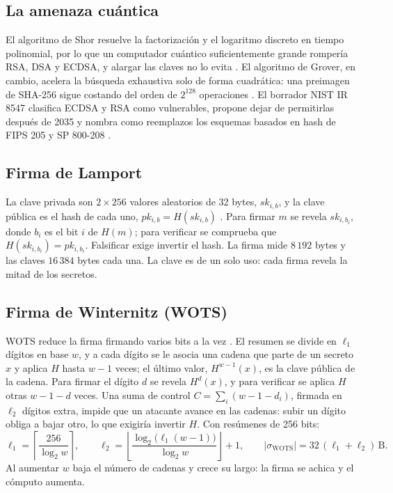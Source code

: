 \documentclass[12pt,letterpaper]{article}
\newcommand{\B}{\,\mathrm{B}}   %
\begin{document}
\subsection{La amenaza cuántica}
El algoritmo de Shor resuelve la factorización y el logaritmo discreto en tiempo polinomial, por lo que un computador cuántico suficientemente grande rompería RSA, DSA y ECDSA, y alargar las claves no lo evita \parencite{shor1994}. El algoritmo de Grover, en cambio, acelera la búsqueda exhaustiva solo de forma cuadrática: una preimagen de SHA-256 sigue costando del orden de $2^{128}$ operaciones \parencite{grover1996}. El borrador NIST IR 8547 clasifica ECDSA y RSA como vulnerables, propone dejar de permitirlas después de 2035 y nombra como reemplazos los esquemas basados en hash de FIPS 205 y SP 800-208 \parencite{nistir8547}.

\subsection{Firma de Lamport}
La clave privada son $2\times256$ valores aleatorios de 32 bytes, $sk_{i,b}$, y la clave pública es el hash de cada uno, $pk_{i,b}=H(sk_{i,b})$ \parencite{lamport1979}. Para firmar $m$ se revela $sk_{i,b_i}$, donde $b_i$ es el bit $i$ de $H(m)$; para verificar se comprueba que $H(sk_{i,b_i})=pk_{i,b_i}$. Falsificar exige invertir el hash. La firma mide $8\,192$ bytes y las claves $16\,384$ bytes cada una. La clave es de un solo uso: cada firma revela la mitad de los secretos.

\subsection{Firma de Winternitz (WOTS)}
WOTS reduce la firma firmando varios bits a la vez \parencite{merkle1989}. El resumen se divide en $\ell_1$ dígitos en base $w$, y a cada dígito se le asocia una cadena que parte de un secreto $x$ y aplica $H$ hasta $w-1$ veces; el último valor, $H^{w-1}(x)$, es la clave pública de la cadena. Para firmar el dígito $d$ se revela $H^{d}(x)$, y para verificar se aplica $H$ otras $w-1-d$ veces. Una suma de control $C=\sum_i (w-1-d_i)$, firmada en $\ell_2$ dígitos extra, impide que un atacante avance en las cadenas: subir un dígito obliga a bajar otro, lo que exigiría invertir $H$. Con resúmenes de 256 bits:
\begin{equation}
  \ell_1=\left\lceil \frac{256}{\log_2 w}\right\rceil,\qquad
  \ell_2=\left\lfloor \frac{\log_2\!\big(\ell_1 (w-1)\big)}{\log_2 w}\right\rfloor+1,\qquad
  |\sigma_{\mathrm{WOTS}}|=32\,(\ell_1+\ell_2)\B .
\end{equation}
Al aumentar $w$ baja el número de cadenas y crece su largo: la firma se achica y el cómputo aumenta.
\end{document}
